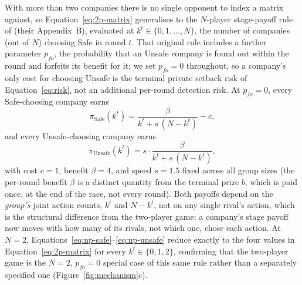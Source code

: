 \documentclass[sigconf,anonymous]{aamas}
\begin{document}
With more than two companies there is no single opponent to index a matrix against, so Equation~\ref{eq:2p-matrix} generalises to the $N$-player stage-payoff rule of \citet{to_regulate_or_not} (their Appendix~B), evaluated at $k^t \in \{0,1,\dots,N\}$, the number of companies (out of $N$) choosing Safe in round $t$. That original rule includes a further parameter $p_{fo}$, the probability that an Unsafe company is found out within the round and forfeits its benefit for it; we set $p_{fo}=0$ throughout, so a company's only cost for choosing Unsafe is the terminal private setback risk of Equation~\ref{eq:risk}, not an additional per-round detection risk. At $p_{fo}=0$, every Safe-choosing company earns
\begin{equation}
    \pi_{\text{Safe}}(k^t) = \frac{\beta}{k^t + s\,(N-k^t)} - c,
    \label{eq:np-safe}
\end{equation}
and every Unsafe-choosing company earns
\begin{equation}
    \pi_{\text{Unsafe}}(k^t) = s \cdot \frac{\beta}{k^t + s\,(N-k^t)},
    \label{eq:np-unsafe}
\end{equation}
with cost $c=1$, benefit $\beta=4$, and speed $s=1.5$ fixed across all group sizes (the per-round benefit $\beta$ is a distinct quantity from the terminal prize $b$, which is paid once, at the end of the race, not every round). Both payoffs depend on the \emph{group's} joint action counts, $k^t$ and $N-k^t$, not on any single rival's action, which is the structural difference from the two-player game: a company's stage payoff now moves with how many of its rivals, not which one, chose each action. At $N=2$, Equations~\ref{eq:np-safe}--\ref{eq:np-unsafe} reduce exactly to the four values in Equation~\ref{eq:2p-matrix} for every $k^t\in\{0,1,2\}$, confirming that the two-player game is the $N=2$, $p_{fo}=0$ special case of this same rule rather than a separately specified one (Figure~\ref{fig:mechanism}c).



\end{document}
